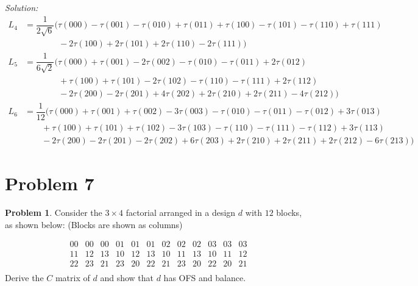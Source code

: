 \documentclass[12pt]{article}
\theoremstyle{definition}
\newtheorem*{prb}{Problem}
\newenvironment{problem}{
\begin{tcolorbox}[colback=blue!5!white,colframe=blue!75!black, parbox = true] \begin{prb}  }{\end{prb}\end{tcolorbox} }
\newenvironment{answer}{\textit{Solution: }\quad }{ \hfill \qedsymbol}
\begin{document}
\begin{answer}
	\begin{align*}
		L_4 & = \dfrac{1}{2\sqrt{6}} \Big(
			 \tau(000) - \tau(001) 
			- \tau(010) + \tau(011)
			+ \tau(100) - \tau(101)
			- \tau(110) + \tau(111)\\
			& \qquad \qquad
			-2 \tau(100) + 2\tau(101)
			+ 2 \tau(110) - 2\tau(111)
			\Big)\\
		L_5 & = \dfrac{1}{6\sqrt{2}} \Big(
			\tau(000) + \tau(001) - 2\tau(002)
			- \tau(010) - \tau(011) + 2\tau(012)\\
			& \qquad \qquad
			+ \tau(100) + \tau(101) - 2\tau(102)
			- \tau(110) - \tau(111) + 2\tau(112)\\
			& \qquad \qquad
			-2\tau(200) -2 \tau(201) +4 \tau(202)
			+ 2\tau(210) + 2\tau(211) - 4\tau(212)
			\Big)\\
		L_6 & = \dfrac{1}{12} \Big(
			\tau(000) + \tau(001) + \tau(002) - 3\tau(003)	
			- \tau(010) - \tau(011) - \tau(012) + 3\tau(013)\\
			& \qquad
			+ \tau(100) + \tau(101) + \tau(102) - 3\tau(103)	
			- \tau(110) - \tau(111) - \tau(112) + 3\tau(113)\\	
			& \qquad
			-2\tau(200) -2 \tau(201) -2 \tau(202) +6\tau(203)	
			+ 2\tau(210) + 2\tau(211) + 2\tau(212) - 6\tau(213)
		\Big)
	\end{align*}

\end{answer}


\section{Problem 7}

\begin{problem}
	Consider the $3 \times 4$ factorial arranged in a design $d$ with $12$ blocks, as shown below: (Blocks are shown as columns)

	$$
	\begin{array}{llllllllllll}
		00 & 00 & 00 & 01 & 01 & 01 & 02 & 02 & 02 & 03 & 03 & 03\\
		11 & 12 & 13 & 10 & 12 & 13 & 10 & 11 & 13 & 10 & 11 & 12\\
		22 & 23 & 21 & 23 & 20 & 22 & 21 & 23 & 20 & 22 & 20 & 21\\
	\end{array}
	$$
	Derive the $C$ matrix of $d$ and show that $d$ has OFS and balance.
\end{problem}
\end{document}
